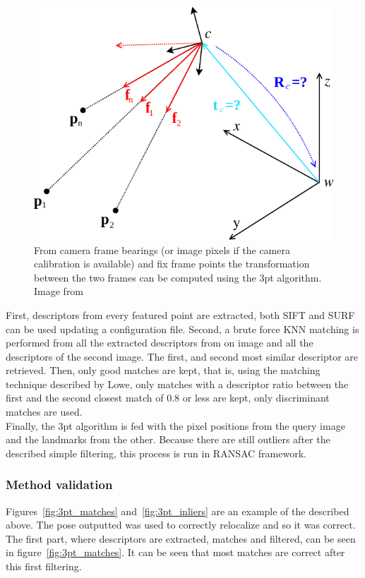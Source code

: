 \begin{figure}[htpb]
  \centering
  \includegraphics[width=0.6\linewidth]{img/absolute_central.png}
  \caption{From camera frame bearings (or image pixels if the camera calibration is available) and fix frame points the transformation between the two frames can be computed using the 3pt algorithm. Image from \cite{kneipopengv}}
  \label{fig:img/absolute_centra}
\end{figure}

First, descriptors from every featured point are extracted, both SIFT and SURF can be used updating a configuration file. Second, a brute force KNN matching is performed from all the extracted descriptors from on image and all the descriptors of the second image. The first, and second most similar descriptor are retrieved. Then, only good matches are kept, that is, using the matching technique described by Lowe, only matches with a descriptor ratio between the first and the second closest match of 0.8 or less are kept, only discriminant matches are used.\\

Finally, the 3pt algorithm is fed with the pixel positions from the query image and the landmarks from the other. Because there are still outliers after the described simple filtering, this process is run in RANSAC framework. \\


\subsubsection{Method validation}
\label{ssub:3pt_method_validation}

Figures~\ref{fig:3pt_matches} and~\ref{fig:3pt_inliers} are an example of the described above. The pose outputted was used to correctly relocalize and so it was correct.\\

The first part, where descriptors are extracted, matches and filtered, can be seen in figure~\ref{fig:3pt_matches}.  It can be seen that most matches are correct after this first filtering.\\

